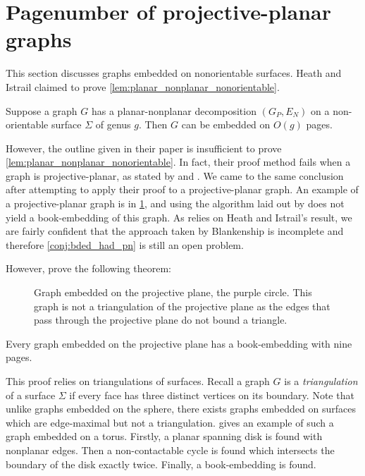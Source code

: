 
\section{Pagenumber of projective-planar graphs}
This section discusses graphs embedded on nonorientable surfaces. Heath and Istrail claimed to prove \cref{lem:planar_nonplanar_nonorientable}.
\begin{conjecture}\label{lem:planar_nonplanar_nonorientable}
	Suppose a graph \(G\) has a planar-nonplanar decomposition \((G_P, E_N)\) on a non-orientable surface \(\Sigma\) of genus $g$. Then \(G\) can be embedded on \( O(g)\) pages.
\end{conjecture}
However, the outline given in their paper is insufficient to prove \cref{lem:planar_nonplanar_nonorientable}. In fact, their proof method fails when a graph is projective-planar, as stated by \textcite{nakamotoBookEmbeddingProjectiveplanar2015} and \textcite{ozekiBookEmbeddingGraphs2019}. We came to the same conclusion after attempting to apply their proof to a projective-planar graph. An example of a projective-planar graph is in \cref{fig:projectiveplanar}, and using the algorithm laid out by \textcite{heathPagenumberGenusGraphs1992} does not yield a book-embedding of this graph. 
As \textcite{Blankenship-PhD03} relies on Heath and Istrail's result, we are fairly confident that the approach taken by Blankenship is incomplete and therefore \cref{conj:bded_had_pn} is still an open problem. 

However, \textcite{nakamotoBookEmbeddingProjectiveplanar2015} prove the following theorem:

\begin{figure}[h]
    \centering
    
    \caption[Projective planar graph]{Graph embedded on the projective plane, the purple circle. This graph is not a triangulation of the projective plane as the edges that pass through the projective plane do not bound a triangle.}\label{fig:projectiveplanar}\end{figure}

\begin{theorem}\label{thm:proj_planar_graphs_9pages}
	Every graph embedded on the projective plane has a book-embedding with nine pages.
\end{theorem}

This proof relies on triangulations of surfaces. Recall a graph $G$ is a \textit{triangulation} of a surface $\Sigma$ if every face has three distinct vertices on its boundary. Note that unlike graphs embedded on the sphere, there exists graphs embedded on surfaces which are edge-maximal but not a triangulation. \textcite{hararyMaximalToroidalGraph1973} gives an example of such a graph embedded on a torus. Firstly, a planar spanning disk is found with nonplanar edges. Then a non-contactable cycle is found which intersects the boundary of the disk exactly twice. Finally, a book-embedding is found.

